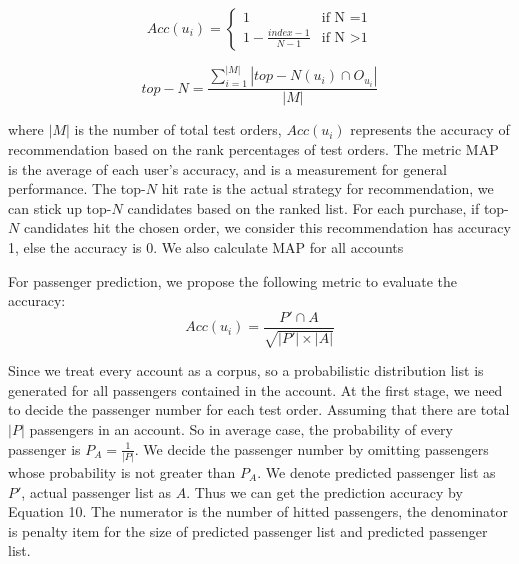 \documentclass{sig-alternate-05-2015}
\begin{document}
\begin{equation}
Acc(u_i) =
\begin{cases}
1 & \mbox{if N =1}\\
1 - \frac{index-1}{N-1} & \mbox{if N >1}
\end{cases}
\end{equation}

\begin{equation}
top-N = \frac{\sum_{i=1}^{|M|}|top-N(u_i) \cap O_{u_i}|}{|M|}
\end{equation}

where $|M|$ is the number of total test orders, $Acc(u_i)$ represents the accuracy of recommendation based on the rank percentages of test orders. The metric MAP is the average of each user's accuracy, and is a measurement for general performance. The top-$N$ hit rate is the actual strategy for recommendation, we can stick up top-$N$ candidates based on the ranked list. For each purchase, if top-$N$ candidates hit the chosen order, we consider this recommendation has accuracy 1, else the accuracy is 0. We also calculate MAP for all accounts \par
For passenger prediction, we propose the following metric to evaluate the accuracy:\\
\begin{equation}
Acc(u_i) = \frac{P' \cap A}{\sqrt{|P'| \times |A|}}
\end{equation}\par
Since we treat every account as a corpus, so a probabilistic distribution list is generated for all passengers contained in the account. At the first stage, we need to decide the passenger number for each test order. Assuming that there are total $|P|$ passengers in an account. So in average case, the probability of every passenger is $P_A = \frac{1}{|P|}$. We decide the passenger number by omitting passengers whose probability is not greater than $P_A$. We denote predicted passenger list as $P'$, actual passenger list as $A$. Thus we can get the prediction accuracy by Equation 10. The numerator is the number of hitted passengers, the denominator is penalty item for the size of predicted passenger list and predicted passenger list.
\end{document}

